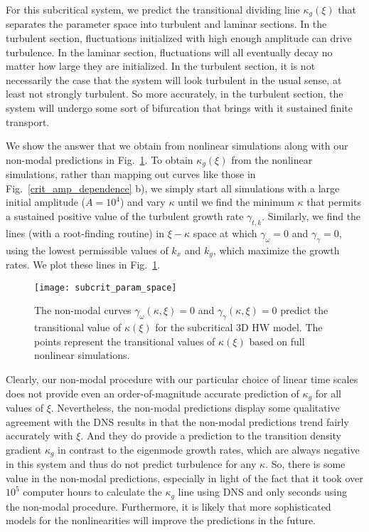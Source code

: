 \documentclass[twocolumn,showkeys,superscriptaddress]{revtex4}
\begin{document}
For this subcritical system, we predict the transitional dividing line $\kappa_g(\xi)$ that separates the parameter space into turbulent and laminar sections. In the turbulent section, 
fluctuations initialized with high enough amplitude can drive turbulence. In the laminar section, fluctuations will all eventually decay no matter how large they are initialized. 
In the turbulent section, it is not necessarily the case that the system will look turbulent in the usual sense, at least not strongly turbulent.
So more accurately, in the turbulent section, the system will undergo some sort of bifurcation that brings with it sustained finite transport.

We show the answer that we obtain from nonlinear simulations along with our non-modal predictions in Fig.~\ref{subcrit_param_space}. To obtain $\kappa_g(\xi)$ from the nonlinear simulations,
rather than mapping out curves like those in Fig.~\ref{crit_amp_dependence} b), we simply start all simulations with a large initial amplitude ($A = 10^4$) and vary $\kappa$ until we find the minimum $\kappa$ that
permits a sustained positive value of the turbulent growth rate $\gamma_{t,k}$.
Similarly, we find the lines (with a root-finding routine) in $\xi-\kappa$ space at which $\gamma_{\omega} = 0$ and $\gamma_{\gamma} = 0$, using the lowest permissible values of $k_x$ and $k_y$, which maximize the growth rates. 
We plot these lines in Fig.~\ref{subcrit_param_space}.

\begin{figure}
\centerline{\texttt{[image: subcrit\_param\_space]}}
\caption{The non-modal curves $\gamma_{\omega}(\kappa,\xi) = 0$ and $\gamma_{\gamma}(\kappa,\xi) = 0$ predict the transitional value of $\kappa(\xi)$ for the subcritical 3D HW model. The points represent the
transitional values of $\kappa(\xi)$ based on full nonlinear simulations.}
\label{subcrit_param_space}
\end{figure}

Clearly, our non-modal procedure with our particular choice of linear time scales does not provide even an order-of-magnitude accurate prediction of $\kappa_g$ for all values of $\xi$.
Nevertheless, the non-modal predictions display some qualitative agreement with the DNS results in that the non-modal predictions trend fairly accurately with $\xi$. 
And they do provide a prediction to the transition density gradient $\kappa_g$ in contrast to the eigenmode growth rates, which are always negative in this system and thus do not predict turbulence for any $\kappa$.
So, there is some value in the non-modal predictions, especially in light of the fact that it took over $10^5$ computer hours to calculate the $\kappa_g$ line using DNS and only seconds using the non-modal procedure.
Furthermore, it is likely that more sophisticated models for the nonlinearities will improve the predictions in the future.
\end{document}

